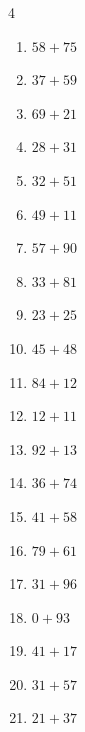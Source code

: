 \begin{multicols}{4}
\begin{enumerate}
  \item $58+75$
        \phantom{$=133$}

  \item $37+59$
        \phantom{$=96$}

  \item $69+21$
        \phantom{$=90$}

\columnbreak %

  \item $28+31$
        \phantom{$=59$}

  \item $32+51$
        \phantom{$=83$}

  \item $49+11$
        \phantom{$=60$}

  \item $57+90$
        \phantom{$=147$}

  \item $33+81$
        \phantom{$=114$}

  \item $23+25$
        \phantom{$=48$}

  \item $45+48$
        \phantom{$=93$}

  \item $84+12$
        \phantom{$=96$}

  \item $12+11$
        \phantom{$=23$}

  \item $92+13$
        \phantom{$=105$}

  \item $36+74$
        \phantom{$=110$}

  \item $41+58$
        \phantom{$=99$}

  \item $79+61$
        \phantom{$=140$}

  \item $31+96$
        \phantom{$=127$}

  \item $0+93$
        \phantom{$=93$}

  \item $41+17$
        \phantom{$=58$}

  \item $31+57$
        \phantom{$=88$}

  \item $21+37$
        \phantom{$=58$}


\end{enumerate}
\end{multicols}
